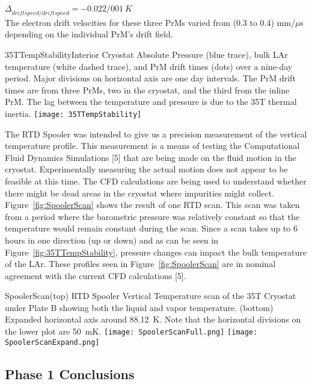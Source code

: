  $\Delta_{driftspeed/\overline{driftspeed}} = -0.022/001~K$\\
 
The electron drift velocities for these three PrMs varied from (0.3 to 0.4) mm/$\mu$s depending on the individual PrM's drift field. 

\begin{cdrfigure}{35TTempStability}{Interior Cryostat Absolute Pressure 
(blue trace), bulk LAr temperature (white dashed trace), and PrM drift times (dots) over a nine-day period. 
Major divisions on horizontal axis are one day intervals. The PrM drift times are from three PrMs, two in 
the cryostat, and the third from the inline PrM. The lag between the temperature and pressure is due to 
the 35T thermal inertia.}
  \texttt{[image: 35TTempStability]}
\end{cdrfigure}

The RTD Spooler was intended to give us a precision measurement of the vertical temperature profile. 
This measurement is a means of testing the Computational Fluid Dynamics Simulations [5]\fixme{} that 
are being made on the fluid motion in the cryostat. Experimentally measuring the actual motion does not 
appear to be feasible at this time. The CFD calculations are being used to understand whether there 
might be dead areas in the cryostat where impurities might collect. Figure~\ref{fig:SpoolerScan} shows the result of one RTD 
scan. This scan was taken from a period where the barometric pressure was relatively constant so that 
the temperature would remain constant during the scan. Since a scan takes up to 6 hours in one direction 
(up or down) and as can be seen in Figure~\ref{fig:35TTempStability}, pressure changes can impact the 
bulk temperature of the LAr. These profiles seen in Figure~\ref{fig:SpoolerScan} are in nominal 
agreement with the current CFD calculations [5\fixme{}].


\begin{cdrfigure}{SpoolerScan}{(top) RTD Spooler Vertical Temperature scan of the 35T Cryostat under Plate B showing both the liquid and vapor temperature.  (bottom) Expanded horizontal axis around 88.12~K. Note that the horizontal divisions on the lower plot are 50~mK. }
\texttt{[image: SpoolerScanFull.png]}
\texttt{[image: SpoolerScanExpand.png]}  
\end{cdrfigure}

\subsection{Phase 1 Conclusions}

